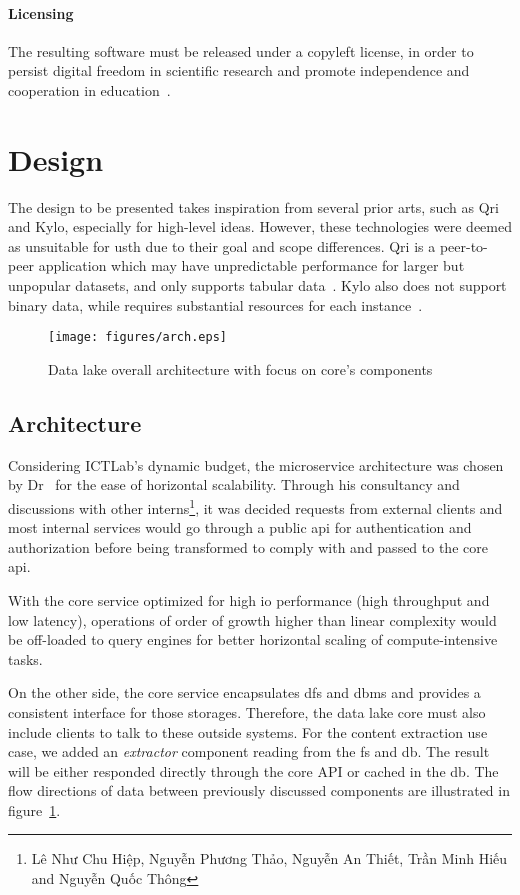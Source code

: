 \paragraph{Licensing}  The resulting software must be released under
a copyleft license, in order to persist digital freedom in scientific research
and promote independence and cooperation in education~\cite{libredu}.

\section{Design}
The design to be presented takes inspiration from several prior arts, such as
Qri and Kylo, especially for high-level ideas.  However, these technologies were
deemed as unsuitable for \gls{usth} due to their goal and scope differences.
Qri is a peer-to-peer application which may have unpredictable performance
for larger but unpopular datasets, and only supports tabular data~\cite{qri}.
Kylo also does not support binary data, while requires substantial resources
for each instance~\cite{kylo}.

\begin{figure}[ht]\centering
  \texttt{[image: figures/arch.eps]}
  \caption{Data lake overall architecture with focus on core's components}
  \label{arch}
\end{figure}

\subsection{Architecture}
Considering ICTLab's dynamic budget, the microservice architecture
was chosen by Dr~\thesupervisor{} for the ease of horizontal scalability.
Through his consultancy
and discussions with other interns\footnote{Lê
Như Chu Hiệp, Nguyễn Phương Thảo, Nguyễn An Thiết, Trần Minh Hiếu
and Nguyễn Quốc Thông}, it was decided requests from external clients
and most internal services would go through a public \gls{api} for
authentication and authorization before being transformed to comply with
and passed to the core \gls{api}.

With the core service optimized for high \gls{io} performance (high throughput
and low latency), operations of order of growth higher than linear complexity
would be off-loaded to query engines for better horizontal scaling
of compute-intensive tasks.

On the other side, the core service encapsulates \gls{dfs} and \gls{dbms}
and provides a consistent interface for those storages.  Therefore,
the data lake core must also include clients to talk to these outside systems.
For the content extraction use case, we added an \emph{extractor} component
reading from the \gls{fs} and \gls{db}.  The result will be either responded
directly through the core API or cached in the \gls{db}.  The flow directions
of data between previously discussed components are illustrated
in figure~\ref{arch}.


